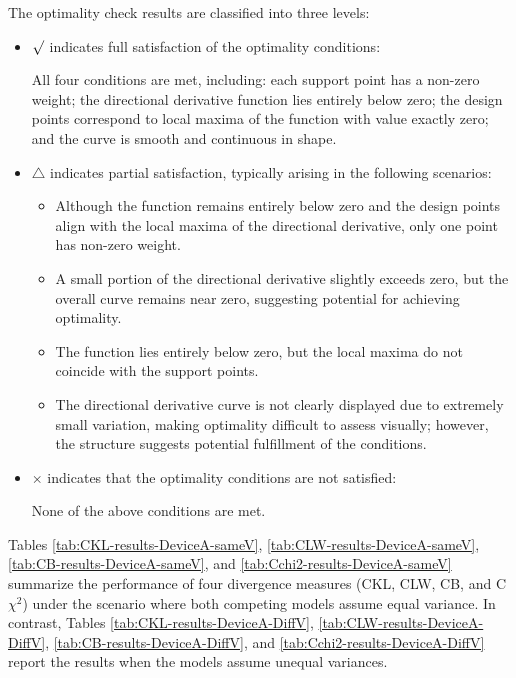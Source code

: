 The optimality check results are classified into three levels:

\begin{itemize}
\item $\surd$ indicates full satisfaction of the optimality conditions:

All four conditions are met, including: each support point has a non-zero weight; the directional derivative function lies entirely below zero; the design points correspond to local maxima of the function with value exactly zero; and the curve is smooth and continuous in shape.

\item $\triangle$ indicates partial satisfaction, typically arising in the following scenarios:

\begin{itemize} 
\item Although the function remains entirely below zero and the design points align with the local maxima of the directional derivative, only one point has non-zero weight.

\item A small portion of the directional derivative slightly exceeds zero, but the overall curve remains near zero, suggesting potential for achieving optimality.

\item The function lies entirely below zero, but the local maxima do not coincide with the support points.

\item The directional derivative curve is not clearly displayed due to extremely small variation, making optimality difficult to assess visually; however, the structure suggests potential fulfillment of the conditions.
\end{itemize}

\item $\times$ indicates that the optimality conditions are not satisfied:

None of the above conditions are met.
\end{itemize}

\hspace*{8mm} Tables \ref{tab:CKL-results-DeviceA-sameV}, \ref{tab:CLW-results-DeviceA-sameV}, \ref{tab:CB-results-DeviceA-sameV}, and \ref{tab:Cchi2-results-DeviceA-sameV} summarize the performance of four divergence measures (CKL, CLW, CB, and C$\chi^2$) under the scenario where both competing models assume equal variance. In contrast, Tables \ref{tab:CKL-results-DeviceA-DiffV}, \ref{tab:CLW-results-DeviceA-DiffV}, \ref{tab:CB-results-DeviceA-DiffV}, and \ref{tab:Cchi2-results-DeviceA-DiffV} report the results when the models assume unequal variances.

